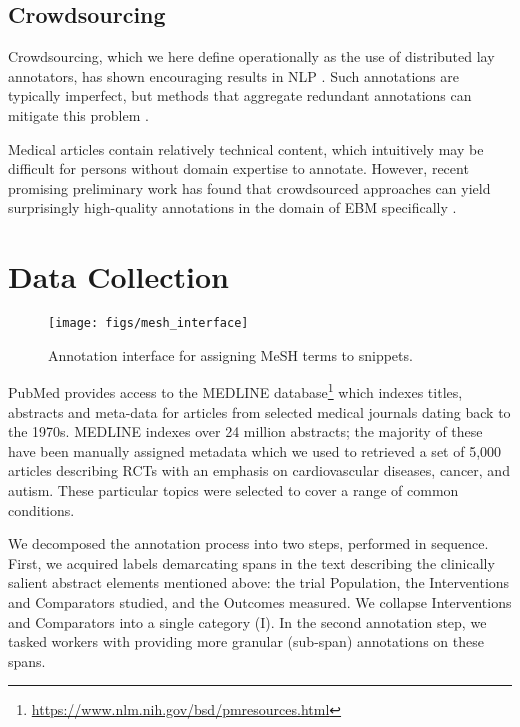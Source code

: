 \documentclass[11pt,a4paper]{article}
\begin{document}
\subsection{Crowdsourcing}

Crowdsourcing, which we here define operationally as the use of distributed lay annotators, has shown encouraging results in NLP \cite{novotney2010cheap,sabou2012crowdsourcing}. Such annotations are typically imperfect, but methods that aggregate redundant annotations can mitigate this problem \cite{dalvi2013aggregating,hovy2014experiments,nguyen2017aggregating}.

Medical articles contain relatively technical content, which intuitively may be difficult for persons without domain expertise to annotate. However, recent promising preliminary work has found that crowdsourced approaches can yield surprisingly high-quality annotations in the domain of EBM specifically \cite{mortensen2017exploration,thomas2017living,wallace2017identifying}. 








\section{Data Collection}
\label{section:collection}

\begin{figure*}
\centering
\texttt{[image: figs/mesh\_interface]}
\caption{Annotation interface for assigning MeSH terms to snippets.}
\end{figure*}



PubMed provides access to the MEDLINE database\footnote{\url{https://www.nlm.nih.gov/bsd/pmresources.html}} which indexes titles, abstracts and meta-data for articles from selected medical journals dating back to the 1970s. MEDLINE indexes over 24 million abstracts; the majority of these have been manually assigned metadata which we used to retrieved a set of 5,000 articles describing RCTs with an emphasis on cardiovascular diseases, cancer, and autism. These particular topics were selected to cover a range of common conditions.





We decomposed the annotation process into two steps, performed in sequence. First, we acquired labels demarcating spans in the text describing the clinically salient abstract elements mentioned above: the trial Population, the Interventions and Comparators studied, and the Outcomes measured. We collapse Interventions and Comparators into a single category (I).
In the second annotation step, we tasked workers with providing more granular (sub-span) annotations on these spans. 
\end{document}
